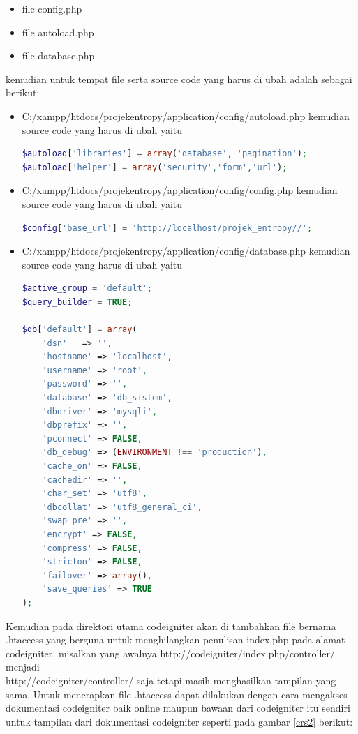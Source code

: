\begin{itemize}
\item file config.php
\item file autoload.php
\item file database.php
\end{itemize}
\pagebreak
kemudian untuk tempat file serta source code yang harus di ubah adalah sebagai berikut:

\begin{itemize}
\item C:/xampp/htdocs/projekentropy/application/config/autoload.php kemudian source code yang harus di ubah yaitu
\begin{lstlisting}[language=PHP]
$autoload['libraries'] = array('database', 'pagination');
$autoload['helper'] = array('security','form','url');
\end{lstlisting} 
\item C:/xampp/htdocs/projekentropy/application/config/config.php kemudian source code yang harus di ubah yaitu
\begin{lstlisting}[language=PHP]
$config['base_url'] = 'http://localhost/projek_entropy//';
\end{lstlisting}
\item C:/xampp/htdocs/projekentropy/application/config/database.php kemudian source code yang harus di ubah yaitu
\begin{lstlisting}[language=PHP]
$active_group = 'default';
$query_builder = TRUE;

$db['default'] = array(
	'dsn'	=> '',
	'hostname' => 'localhost',
	'username' => 'root',
	'password' => '',
	'database' => 'db_sistem',
	'dbdriver' => 'mysqli',
	'dbprefix' => '',
	'pconnect' => FALSE,
	'db_debug' => (ENVIRONMENT !== 'production'),
	'cache_on' => FALSE,
	'cachedir' => '',
	'char_set' => 'utf8',
	'dbcollat' => 'utf8_general_ci',
	'swap_pre' => '',
	'encrypt' => FALSE,
	'compress' => FALSE,
	'stricton' => FALSE,
	'failover' => array(),
	'save_queries' => TRUE
);

\end{lstlisting}
\end{itemize}
\pagebreak
Kemudian pada direktori utama codeigniter akan di tambahkan file bernama .htaccess yang berguna untuk menghilangkan penulisan index.php pada alamat codeigniter, misalkan yang awalnya http://codeigniter/index.php/controller/ menjadi \\
http://codeigniter/controller/ saja tetapi masih menghasilkan tampilan yang sama. Untuk menerapkan file .htaccess dapat dilakukan dengan cara mengakses dokumentasi codeigniter baik online maupun bawaan dari codeigniter itu sendiri untuk tampilan dari dokumentasi codeigniter seperti pada gambar \ref{crs2} berikut:\par


